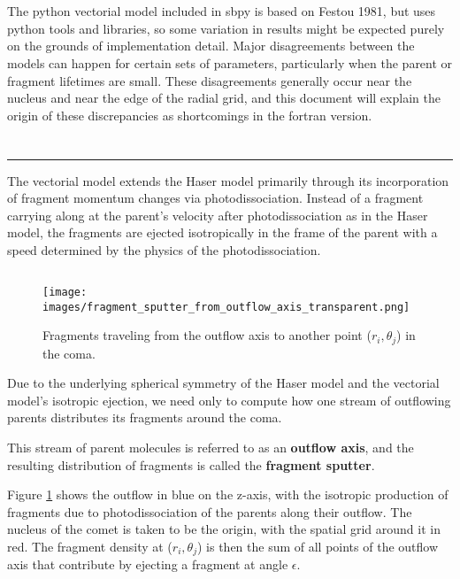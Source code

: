 \documentclass[11pt]{article}
\newcommand{\modelterm}[1]{\textcolor{myred}{\textbf{#1}}}
\newcommand{\modeltermblue}[1]{\textcolor{myblue}{\textbf{#1}}}
\newcommand{\newproblem}[1]{\section*{\contour{mybblack}{\textcolor{myblack}{#1}}}}
\newcommand{\problempart}[1]{\subsection*{\contour{mybblack}{\textcolor{myblack}{#1}}}}
\begin{document}
\newpage

\newproblem{Fortran and Python Model Testing}
The python vectorial model included in sbpy is based on Festou 1981, but uses python tools and libraries, so some variation in results might be expected purely on the grounds of implementation detail.
Major disagreements between the models can happen for certain sets of parameters, particularly when the parent or fragment lifetimes are small.
These disagreements generally occur near the nucleus and near the edge of the radial grid, and this document will explain the origin of these discrepancies as shortcomings in the fortran version.

\newproblem{Vectorial Model Geometry}

\hrule
\vspace{5mm}

The vectorial model extends the Haser model primarily through its incorporation of fragment momentum changes via photodissociation.
Instead of a fragment carrying along at the parent's velocity after photodissociation as in the Haser model, the fragments are ejected isotropically in the frame of the parent with a speed determined by the physics of the photodissociation.

\problempart{Outflow Axis}

\begin{multicols}{2}
  \begin{figure}[H]
    \texttt{[image: images/fragment\_sputter\_from\_outflow\_axis\_transparent.png]}
    \caption{Fragments traveling from the outflow axis to another point (\(r_i, \theta_j\)) in the coma.}
    \label{fig:outflow_sputter}
  \end{figure}

Due to the underlying spherical symmetry of the Haser model and the vectorial model's isotropic ejection, we need only to compute how one stream of outflowing parents distributes its fragments around the coma.

This stream of parent molecules is referred to as an \modeltermblue{outflow axis}, and the resulting distribution of fragments is called the \modelterm{fragment sputter}.

Figure \ref{fig:outflow_sputter} shows the outflow in blue on the z-axis, with the isotropic production of fragments due to photodissociation of the parents along their outflow.
The nucleus of the comet is taken to be the origin, with the spatial grid around it in red.
The fragment density at (\(r_i, \theta_j\)) is then the sum of all points of the outflow axis that contribute by ejecting a fragment at angle \(\epsilon\).
\end{multicols}
\end{document}
